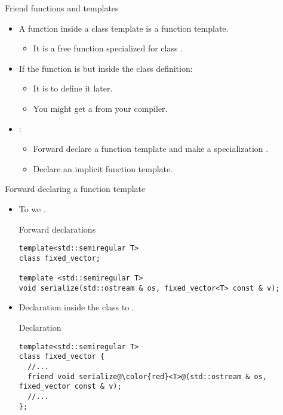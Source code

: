 \begin{frame}[t,fragile]{Friend functions and templates}
\begin{itemize}
  \item A  function inside a class template is 
        a function template.
    \begin{itemize}
      \item It is a free function specialized for class .
    \end{itemize}

  \item If the function is  but 
        inside the class definition:
    \begin{itemize}
      \item It is  to define it later.
      \item You might get a  from your compiler.
    \end{itemize}

  \item {}:
    \begin{itemize}
      \item Forward declare a function template and make a specialization .
      \item Declare an implicit  function template.
    \end{itemize}
\end{itemize}
\end{frame}

\begin{frame}[t,fragile,shrink=15]{Forward declaring a function template}
\begin{itemize}
  \item To  
        we  .

\begin{block}{Forward declarations}
\begin{lstlisting}
template<std::semiregular T>
class fixed_vector;

template <std::semiregular T>
void serialize(std::ostream & os, fixed_vector<T> const & v);
\end{lstlisting}
\end{block}

  \item Declaration inside the class  to .
\begin{block}{Declaration}
\begin{lstlisting}[escapechar=@]
template<std::semiregular T>
class fixed_vector {
  //...
  friend void serialize@\color{red}<T>@(std::ostream & os, fixed_vector const & v);
  //...
};
\end{lstlisting}
\end{block}

\end{itemize}
\end{frame}

